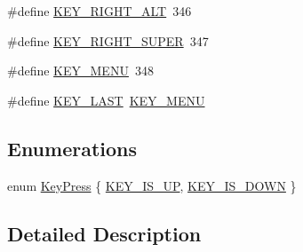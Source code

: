\begin{DoxyCompactItemize}
\item 
\#define \hyperlink{group___keys_ga64ff7fd78f7b580ef2093c1be785ac16}{K\-E\-Y\-\_\-\-R\-I\-G\-H\-T\-\_\-\-A\-L\-T}~346
\item 
\#define \hyperlink{group___keys_ga43633595c9d26f462f00d7a256a02e1f}{K\-E\-Y\-\_\-\-R\-I\-G\-H\-T\-\_\-\-S\-U\-P\-E\-R}~347
\item 
\#define \hyperlink{group___keys_ga711f41a42892af1b1457e0984a7f4ebc}{K\-E\-Y\-\_\-\-M\-E\-N\-U}~348
\item 
\#define \hyperlink{group___keys_gaea07fbab8862471fcd5cdb8d713b5c7c}{K\-E\-Y\-\_\-\-L\-A\-S\-T}~\hyperlink{group___keys_ga711f41a42892af1b1457e0984a7f4ebc}{K\-E\-Y\-\_\-\-M\-E\-N\-U}
\end{DoxyCompactItemize}
\subsection*{Enumerations}
\begin{DoxyCompactItemize}
\item 
enum \hyperlink{group___keys_gac970b9e5a0333d8825c1b14438c6c44b}{Key\-Press} \{ \hyperlink{group___keys_ggac970b9e5a0333d8825c1b14438c6c44ba4866d64ed6491f425d429e187b7359b8}{K\-E\-Y\-\_\-\-I\-S\-\_\-\-U\-P}, 
\hyperlink{group___keys_ggac970b9e5a0333d8825c1b14438c6c44baeb1a09dca4a3e2110110dc97482a7daa}{K\-E\-Y\-\_\-\-I\-S\-\_\-\-D\-O\-W\-N}
 \}
\end{DoxyCompactItemize}


\subsection{Detailed Description}


